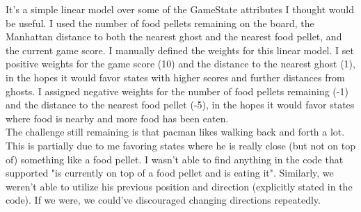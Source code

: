 \documentclass[11pt]{article}
\begin{document}
It's a simple linear model over some of the GameState attributes I thought would be useful. I used the number of food pellets remaining on the board, the Manhattan distance to both the nearest ghost and the nearest food pellet, and the current game score. I manually defined the weights for this linear model. I set positive weights for the game score (10) and the distance to the nearest ghost (1), in the hopes it would favor states with higher scores and further distances from ghosts. I assigned negative weights for the number of food pellets remaining (-1) and the distance to the nearest food pellet (-5), in the hopes it would favor states where food is nearby and more food has been eaten. %
\\

The challenge still remaining is that pacman likes walking back and forth a lot. This is partially due to me favoring states where he is really close (but not on top of) something like a food pellet. I wasn't able to find anything in the code that supported "is currently on top of a food pellet and is eating it". Similarly, we weren't able to utilize his previous position and direction (explicitly stated in the code). If we were, we could've discouraged changing directions repeatedly.
\end{document}

